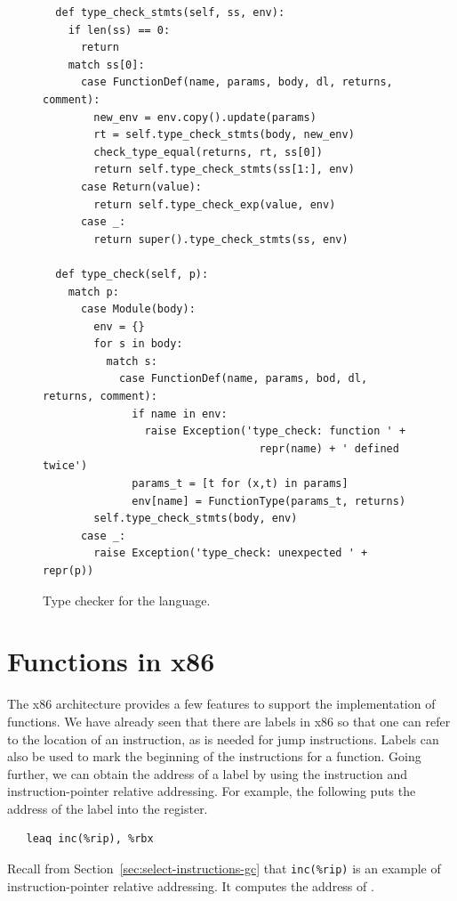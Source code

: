 \documentclass[7x10,nocrop]{TimesAPriori_MIT}%
\begin{document}
\begin{figure}[tp]
{\begin{lstlisting}
  def type_check_stmts(self, ss, env):
    if len(ss) == 0:
      return
    match ss[0]:
      case FunctionDef(name, params, body, dl, returns, comment):
        new_env = env.copy().update(params)
        rt = self.type_check_stmts(body, new_env)
        check_type_equal(returns, rt, ss[0])
        return self.type_check_stmts(ss[1:], env)
      case Return(value):
        return self.type_check_exp(value, env)
      case _:
        return super().type_check_stmts(ss, env)

  def type_check(self, p):
    match p:
      case Module(body):
        env = {}
        for s in body:
          match s:
            case FunctionDef(name, params, bod, dl, returns, comment):
              if name in env:
                raise Exception('type_check: function ' +
                                  repr(name) + ' defined twice')
              params_t = [t for (x,t) in params]
              env[name] = FunctionType(params_t, returns)
        self.type_check_stmts(body, env)
      case _:
        raise Exception('type_check: unexpected ' + repr(p))
\end{lstlisting}
\fi}
\caption{Type checker for the \LangFun{} language.}
\label{fig:type-check-Rfun}
\end{figure}


\clearpage

\section{Functions in x86}
\label{sec:fun-x86}



The x86 architecture provides a few features to support the
implementation of functions. We have already seen that there are
labels in x86 so that one can refer to the location of an instruction,
as is needed for jump instructions. Labels can also be used to mark
the beginning of the instructions for a function.  Going further, we
can obtain the address of a label by using the  instruction
and instruction-pointer relative addressing. For example, the
following puts the address of the  label into the 
register.
\begin{lstlisting}
   leaq inc(%rip), %rbx
\end{lstlisting}
Recall from Section~\ref{sec:select-instructions-gc} that
\verb!inc(%rip)! is an example of instruction-pointer relative
addressing. It computes the address of .
\end{document}
